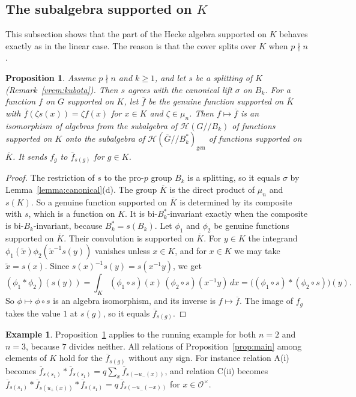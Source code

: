 \documentclass[12pt,letterpaper]{amsart}
\numberwithin{equation}{section}
\newtheorem{proposition}[theorem]{Proposition}
\theoremstyle{definition}
\newtheorem{example}[theorem]{Example}
\theoremstyle{remark}
\newcommand{\cO}{\mathcal{O}}
\newcommand{\cH}{\mathcal{H}}
\newcommand{\Gbar}{\overline{G}}
\newcommand{\gen}{\mathrm{gen}}
\newcommand{\fbar}{\overline{f}}
\newcommand{\Hgen}{\cH(\Gbar/\!/B_k^*)_{\gen}}
\newcommand{\Hlin}{\cH(G/\!/B_k)}
\begin{document}
\subsection{The subalgebra supported on \texorpdfstring{$K$}{K}}
This subsection shows that the part of the Hecke algebra supported on
$K$ behaves exactly as in the linear case. The reason is that the cover
splits over $K$ when $p\nmid n$.

\begin{proposition}
\label{prop:Ksub}
Assume $p\nmid n$ and $k\geq 1$, and let $s$ be a splitting of $K$
(Remark~\ref{vrem:kubota}). Then $s$ agrees with the canonical lift
$\sigma$ on $B_k$. For a function $f$ on $G$ supported on $K$, let
$\fbar$ be the genuine function supported on $\overline{K}$ with
$\fbar(\zeta s(x))=\zeta f(x)$ for $x\in K$ and $\zeta\in\mu_n$. Then
$f\mapsto\fbar$ is an isomorphism of algebras from the subalgebra of
$\Hlin$ of functions supported on $K$ onto the subalgebra of $\Hgen$ of
functions supported on $\overline{K}$. It sends $f_g$ to
$\fbar_{s(g)}$ for $g\in K$.
\end{proposition}

\begin{proof}
The restriction of $s$ to the pro-$p$ group $B_k$ is a splitting, so it
equals $\sigma$ by Lemma~\ref{lemma:canonical}(d). The group
$\overline{K}$ is the direct product of $\mu_n$ and $s(K)$. So a
genuine function supported on $\overline{K}$ is determined by its
composite with $s$, which is a function on $K$. It is
bi-$B_k^*$-invariant exactly when the composite is
bi-$B_k$-invariant, because $B_k^*=s(B_k)$. Let $\phi_1$ and $\phi_2$
be genuine functions supported on $\overline{K}$. Their convolution is
supported on $\overline{K}$. For $y\in K$ the integrand
$\phi_1(\tilde x)\phi_2(\tilde x^{-1}s(y))$ vanishes unless $x\in K$,
and for $x\in K$ we may take $\tilde x=s(x)$. Since
$s(x)^{-1}s(y)=s(x^{-1}y)$, we get
\[
(\phi_1*\phi_2)(s(y))=\int_K(\phi_1\circ s)(x)\,(\phi_2\circ
s)(x^{-1}y)\,dx=\bigl((\phi_1\circ s)*(\phi_2\circ s)\bigr)(y).
\]
So $\phi\mapsto\phi\circ s$ is an algebra isomorphism, and its inverse
is $f\mapsto\fbar$. The image of $f_g$ takes the value $1$ at $s(g)$,
so it equals $\fbar_{s(g)}$.
\end{proof}

\begin{example}
\label{ex:Ksub}
Proposition~\ref{prop:Ksub} applies to the running example for both
$n=2$ and $n=3$, because $7$ divides neither. All relations of
Proposition~\ref{prop:main} among elements of $K$ hold for the
$\fbar_{s(g)}$ without any sign. For instance relation A(i) becomes
$\fbar_{s(s_1)}*\fbar_{s(s_1)}=q\sum_x\fbar_{s(-u_-(x))}$, and relation
C(ii) becomes $\fbar_{s(s_1)}*\fbar_{s(u_+(x))}*\fbar_{s(s_1)}
=q\,\fbar_{s(-u_-(-x))}$ for $x\in\cO^\times$.
\end{example}
\end{document}
